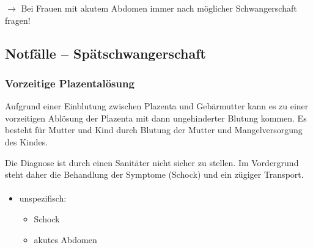 ${\rightarrow}$ Bei Frauen mit akutem Abdomen immer nach möglicher
Schwangerschaft fragen!



\subsection{Notfälle -- Spätschwangerschaft}

\subsubsection{Vorzeitige Plazentalösung}


Aufgrund einer Einblutung zwischen Plazenta und Gebärmutter kann es zu
einer vorzeitigen Ablösung der Plazenta mit dann ungehinderter
Blutung kommen. Es besteht  für Mutter und Kind durch
Blutung der Mutter und Mangelversorgung des Kindes. 

Die Diagnose ist durch einen Sanitäter nicht sicher zu stellen. Im
Vordergrund steht daher die Behandlung der Symptome (Schock) und ein
zügiger Transport. 

\paragraph{\TxSymptome}

\begin{itemize}
  \item unspezifisch:
  \begin{itemize}
    \item Schock
    \item akutes Abdomen
  \end{itemize}
\end{itemize}

